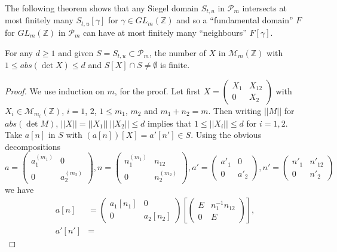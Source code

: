 The following theorem shows that any Siegel domain $S_{t,u}$ in
$\mathscr{P}_{m}$ intersects at most finitely many $S_{t,u}[\gamma]$
for $\gamma\in GL_{m}(\mathbb{Z})$ and so a ``fundamental domain'' $F$
for $GL_{m}(\mathbb{Z})$ in $\mathscr{P}_{m}$ can have at most
finitely many ``neighbours'' $F[\gamma]$.

\begin{subtheorem}\label{c1:thm-1.2.7}
For any $d\geq 1$ and given $S=S_{t,u}\subset \mathscr{P}_{m}$, the
number of $X$ in $\mathscr{M}_{m}(\mathbb{Z})$ with $1\leq abs(\det
X)\leq d$ and $S[X]\cap S\neq \emptyset$ is finite.
\end{subtheorem}

\begin{proof}
We use induction on $m$, for the proof. Let first
$X=\left(\begin{smallmatrix} X_{1} & X_{12}\\ 0 & X_{2}
\end{smallmatrix}\right)$ with $X_{i}\in
\mathscr{M}_{m_{i}}(\mathbb{Z})$, $i=1$, $2$, $1\leq m_{1}$, $m_{2}$
and $m_{1}+n_{2}=m$. Then writing $||M||$ for $abs(\det M)$,
$||X||=||X_{1}|| \ ||X_{2}||\leq d$ implies that $1\leq ||X_{i}||\leq
d$ for $i=1,2$. Take $a[n]$ in $S$ with $(a[n])[X]=a'[n']\in S$. Using
the obvious decompositions 
$$
a=
\begin{pmatrix}
a^{(m_{1})}_{1} & 0\\
0 & a^{(m_{2})}_{2}
\end{pmatrix},
n=
\begin{pmatrix}
n_{1}^{(m_{1})} & n_{12}\\
0 & n^{(m_{2})}_{2}
\end{pmatrix},
a'=
\begin{pmatrix}
a'_{1} & 0\\
0 & a'_{2}
\end{pmatrix},
n'=
\begin{pmatrix}
n'_{1} & n'_{12}\\
0 & n'_{2}
\end{pmatrix}
$$
we have
\begin{align*}
a[n]&=
\begin{pmatrix}
a_{1}[n_{1}] & 0\\
0 & a_{2}[n_{2}]
\end{pmatrix}
\left[
\begin{pmatrix}
E & n^{-1}_{1}n_{12}\\
0 & E
\end{pmatrix}
\right],\\ 
a'[n']&=

\end{align*}
\end{proof}
